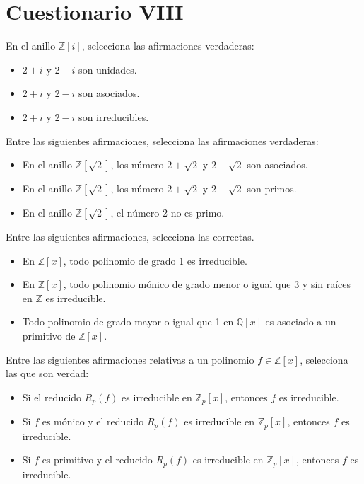 \section{Cuestionario VIII}

\begin{ejercicio}
    En el anillo $\mathbb{Z}[i]$, selecciona las afirmaciones verdaderas:
    \begin{itemize}
        \item $2+ i$ y $2-i$ son unidades.
        \item $2+i$ y $2-i$ son asociados.
        \item $2+i$ y $2-i$ son irreducibles.
    \end{itemize}
\end{ejercicio}

\begin{ejercicio}
    Entre las siguientes afirmaciones, selecciona las afirmaciones verdaderas:
    \begin{itemize}
        \item En el anillo $\mathbb{Z}\left[\sqrt{2}\right]$, los número $2+\sqrt{2}$ y $2-\sqrt{2}$ son asociados.
        \item En el anillo $\mathbb{Z}\left[\sqrt{2}\right]$, los número $2+\sqrt{2}$ y $2-\sqrt{2}$ son primos.
        \item En el anillo $\mathbb{Z}\left[\sqrt{2}\right]$, el número 2 no es primo.
    \end{itemize}
\end{ejercicio}

\begin{ejercicio}
    Entre las siguientes afirmaciones, selecciona las correctas.
    \begin{itemize}
        \item En $\mathbb{Z}[x]$, todo polinomio de grado 1 es irreducible.
        \item En $\mathbb{Z}[x]$, todo polinomio mónico de grado menor o igual que 3 y sin raíces en $\mathbb{Z}$ es irreducible.
        \item Todo polinomio de grado mayor o igual que 1 en $\mathbb{Q}[x]$ es asociado a un primitivo de $\mathbb{Z}[x]$.
    \end{itemize}
\end{ejercicio}

\begin{ejercicio}
    Entre las siguientes afirmaciones relativas a un polinomio $f\in \mathbb{Z}[x]$, selecciona las que son verdad:
    \begin{itemize}
        \item Si el reducido $R_p(f)$ es irreducible en $\mathbb{Z}_p[x]$, entonces $f$ es irreducible.
        \item Si $f$ es mónico y el reducido $R_p(f)$ es irreducible en $\mathbb{Z}_p[x]$, entonces $f$ es irreducible.
        \item Si $f$ es primitivo y el reducido $R_p(f)$ es irreducible en $\mathbb{Z}_p[x]$, entonces $f$ es irreducible.
    \end{itemize}
\end{ejercicio}

